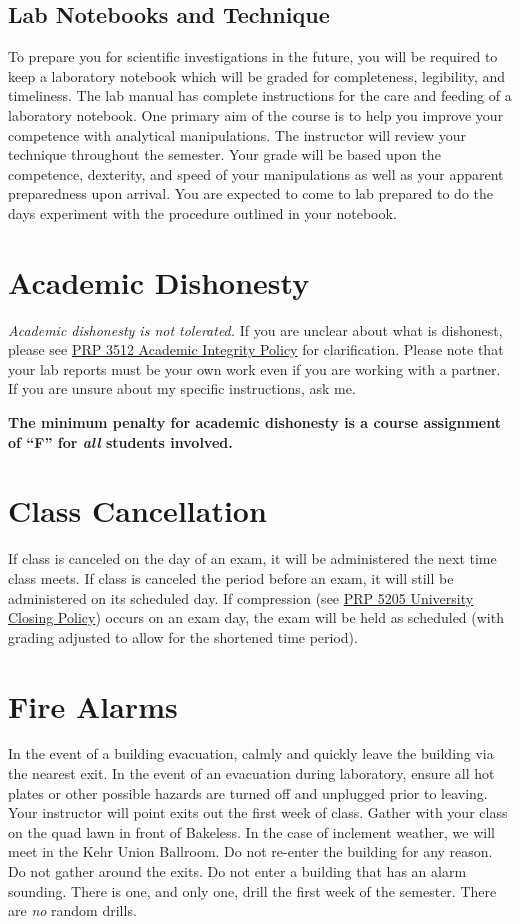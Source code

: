 \documentclass[11pt,letterpaper]{article}
\begin{document}
\subsection{Lab Notebooks and Technique}
To prepare you for scientific investigations in the future, you will be
required to keep a laboratory notebook which will be graded for completeness,
legibility, and timeliness. The lab manual has
complete instructions for the care and feeding of a laboratory notebook.  One
primary aim of the course is to help you improve your competence with
analytical manipulations.  The instructor will review your technique throughout
the semester. Your grade will be based upon the competence, dexterity, and
speed of your manipulations as well as your apparent preparedness upon arrival.
You are expected to come to lab prepared to do the days experiment with the
procedure outlined in your notebook.

\section{Academic Dishonesty}
\emph{Academic dishonesty is not tolerated.} If you are unclear about what is
dishonest, please see 
\href{https://www.bloomu.edu/prp-3512-academic-integrity-policy}{PRP 3512
Academic Integrity Policy} for clarification. Please note that your lab reports
must be your own work even if you are working with a partner. If you are unsure
about my specific instructions, ask me.

\begin{mdframed}
	\centering\bfseries The minimum penalty for academic dishonesty is a
	course assignment of ``F'' for \emph{all} students involved.
\end{mdframed}

\section{Class Cancellation}
If class is canceled on the day of an exam, it will be administered the next
time class meets.  If class is canceled the period before an exam, it will
still be administered on its scheduled day. If compression
(see \href{https://www.bloomu.edu/documents/prp5205}{PRP 5205 University Closing
Policy})
occurs on an exam day, the exam will be held as scheduled (with
grading adjusted to allow for the shortened time period).

\section{Fire Alarms}
In the event of a building evacuation, calmly and quickly leave the building via
the nearest exit. In the event of an evacuation during laboratory, ensure all
hot plates or other possible hazards are turned off and unplugged prior to
leaving. Your instructor will point exits out the first week of class.  Gather
with your class on the quad lawn in front of Bakeless. In the case of inclement
weather, we will meet in the Kehr Union Ballroom. Do not re-enter the
building for any reason. Do not gather around the exits. Do not enter a
building that has an alarm sounding. There is one, and only one, drill the first
week of the semester. There are \emph{no} random drills.
\end{document}
